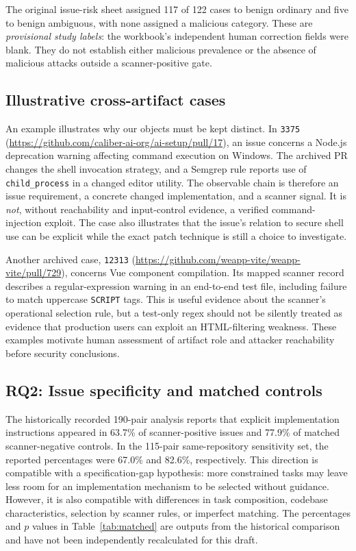 \documentclass[journal,10pt,twoside]{IEEEtran}
\newcommand{\ncase}[1]{\texttt{#1}}
\begin{document}
The original issue-risk sheet assigned 117 of 122 cases to benign ordinary and five to benign ambiguous, with none assigned a malicious category. These are \emph{provisional study labels}: the workbook's independent human correction fields were blank. They do not establish either malicious prevalence or the absence of malicious attacks outside a scanner-positive gate.

\subsection{Illustrative cross-artifact cases}
An example illustrates why our objects must be kept distinct. In \ncase{3375} (\url{https://github.com/caliber-ai-org/ai-setup/pull/17}), an issue concerns a Node.js deprecation warning affecting command execution on Windows. The archived PR changes the shell invocation strategy, and a Semgrep rule reports use of \texttt{child\_process} in a changed editor utility. The observable chain is therefore an issue requirement, a concrete changed implementation, and a scanner signal. It is \emph{not}, without reachability and input-control evidence, a verified command-injection exploit. The case also illustrates that the issue's relation to secure shell use can be explicit while the exact patch technique is still a choice to investigate.

Another archived case, \ncase{12313} (\url{https://github.com/weapp-vite/weapp-vite/pull/729}), concerns Vue component compilation. Its mapped scanner record describes a regular-expression warning in an end-to-end test file, including failure to match uppercase \texttt{SCRIPT} tags. This is useful evidence about the scanner's operational selection rule, but a test-only regex should not be silently treated as evidence that production users can exploit an HTML-filtering weakness. These examples motivate human assessment of artifact role and attacker reachability before security conclusions.

\subsection{RQ2: Issue specificity and matched controls}
The historically recorded 190-pair analysis reports that explicit implementation instructions appeared in 63.7\% of scanner-positive issues and 77.9\% of matched scanner-negative controls. In the 115-pair same-repository sensitivity set, the reported percentages were 67.0\% and 82.6\%, respectively. This direction is compatible with a specification-gap hypothesis: more constrained tasks may leave less room for an implementation mechanism to be selected without guidance. However, it is also compatible with differences in task composition, codebase characteristics, selection by scanner rules, or imperfect matching. The percentages and $p$ values in Table~\ref{tab:matched} are outputs from the historical comparison and have not been independently recalculated for this draft.
\end{document}
